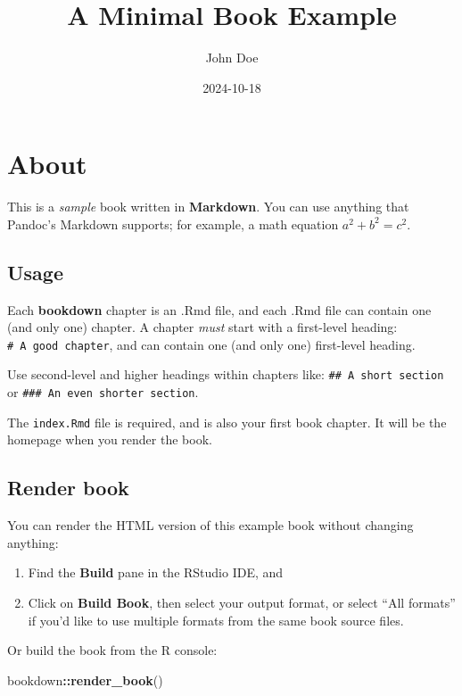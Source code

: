 \documentclass[
]{book}
\title{A Minimal Book Example}
\author{John Doe}
\date{2024-10-18}
\newenvironment{Shaded}{\begin{snugshade}}{\end{snugshade}}
\newcommand{\FunctionTok}[1]{\textcolor[rgb]{0.13,0.29,0.53}{\textbf{#1}}}
\newcommand{\NormalTok}[1]{#1}
\newcommand{\SpecialCharTok}[1]{\textcolor[rgb]{0.81,0.36,0.00}{\textbf{#1}}}
\theoremstyle{definition}
\theoremstyle{definition}
\theoremstyle{definition}
\theoremstyle{definition}
\theoremstyle{remark}
\begin{document}
\maketitle

{
\setcounter{tocdepth}{1}
\tableofcontents
}
\chapter{About}\label{about}

This is a \emph{sample} book written in \textbf{Markdown}. You can use anything that Pandoc's Markdown supports; for example, a math equation \(a^2 + b^2 = c^2\).

\section{Usage}\label{usage}

Each \textbf{bookdown} chapter is an .Rmd file, and each .Rmd file can contain one (and only one) chapter. A chapter \emph{must} start with a first-level heading: \texttt{\#\ A\ good\ chapter}, and can contain one (and only one) first-level heading.

Use second-level and higher headings within chapters like: \texttt{\#\#\ A\ short\ section} or \texttt{\#\#\#\ An\ even\ shorter\ section}.

The \texttt{index.Rmd} file is required, and is also your first book chapter. It will be the homepage when you render the book.

\section{Render book}\label{render-book}

You can render the HTML version of this example book without changing anything:

\begin{enumerate}
\def\labelenumi{\arabic{enumi}.}
\item
  Find the \textbf{Build} pane in the RStudio IDE, and
\item
  Click on \textbf{Build Book}, then select your output format, or select ``All formats'' if you'd like to use multiple formats from the same book source files.
\end{enumerate}

Or build the book from the R console:

\begin{Shaded}
\begin{Highlighting}[]
\NormalTok{bookdown}\SpecialCharTok{::}\FunctionTok{render\_book}\NormalTok{()}
\end{Highlighting}
\end{Shaded}
\end{document}
